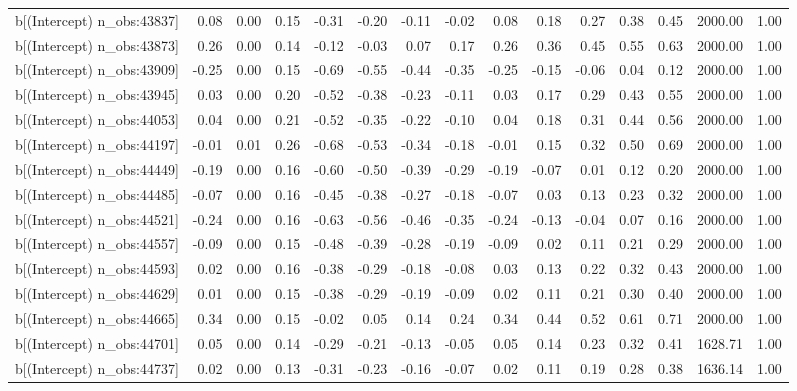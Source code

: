 \begin{table}[ht]
\begin{tabular}{rrrrrrrrrrrrrrr}
  b[(Intercept) n\_obs:43837] & 0.08 & 0.00 & 0.15 & -0.31 & -0.20 & -0.11 & -0.02 & 0.08 & 0.18 & 0.27 & 0.38 & 0.45 & 2000.00 & 1.00 \\ 
  b[(Intercept) n\_obs:43873] & 0.26 & 0.00 & 0.14 & -0.12 & -0.03 & 0.07 & 0.17 & 0.26 & 0.36 & 0.45 & 0.55 & 0.63 & 2000.00 & 1.00 \\ 
  b[(Intercept) n\_obs:43909] & -0.25 & 0.00 & 0.15 & -0.69 & -0.55 & -0.44 & -0.35 & -0.25 & -0.15 & -0.06 & 0.04 & 0.12 & 2000.00 & 1.00 \\ 
  b[(Intercept) n\_obs:43945] & 0.03 & 0.00 & 0.20 & -0.52 & -0.38 & -0.23 & -0.11 & 0.03 & 0.17 & 0.29 & 0.43 & 0.55 & 2000.00 & 1.00 \\ 
  b[(Intercept) n\_obs:44053] & 0.04 & 0.00 & 0.21 & -0.52 & -0.35 & -0.22 & -0.10 & 0.04 & 0.18 & 0.31 & 0.44 & 0.56 & 2000.00 & 1.00 \\ 
  b[(Intercept) n\_obs:44197] & -0.01 & 0.01 & 0.26 & -0.68 & -0.53 & -0.34 & -0.18 & -0.01 & 0.15 & 0.32 & 0.50 & 0.69 & 2000.00 & 1.00 \\ 
  b[(Intercept) n\_obs:44449] & -0.19 & 0.00 & 0.16 & -0.60 & -0.50 & -0.39 & -0.29 & -0.19 & -0.07 & 0.01 & 0.12 & 0.20 & 2000.00 & 1.00 \\ 
  b[(Intercept) n\_obs:44485] & -0.07 & 0.00 & 0.16 & -0.45 & -0.38 & -0.27 & -0.18 & -0.07 & 0.03 & 0.13 & 0.23 & 0.32 & 2000.00 & 1.00 \\ 
  b[(Intercept) n\_obs:44521] & -0.24 & 0.00 & 0.16 & -0.63 & -0.56 & -0.46 & -0.35 & -0.24 & -0.13 & -0.04 & 0.07 & 0.16 & 2000.00 & 1.00 \\ 
  b[(Intercept) n\_obs:44557] & -0.09 & 0.00 & 0.15 & -0.48 & -0.39 & -0.28 & -0.19 & -0.09 & 0.02 & 0.11 & 0.21 & 0.29 & 2000.00 & 1.00 \\ 
  b[(Intercept) n\_obs:44593] & 0.02 & 0.00 & 0.16 & -0.38 & -0.29 & -0.18 & -0.08 & 0.03 & 0.13 & 0.22 & 0.32 & 0.43 & 2000.00 & 1.00 \\ 
  b[(Intercept) n\_obs:44629] & 0.01 & 0.00 & 0.15 & -0.38 & -0.29 & -0.19 & -0.09 & 0.02 & 0.11 & 0.21 & 0.30 & 0.40 & 2000.00 & 1.00 \\ 
  b[(Intercept) n\_obs:44665] & 0.34 & 0.00 & 0.15 & -0.02 & 0.05 & 0.14 & 0.24 & 0.34 & 0.44 & 0.52 & 0.61 & 0.71 & 2000.00 & 1.00 \\ 
  b[(Intercept) n\_obs:44701] & 0.05 & 0.00 & 0.14 & -0.29 & -0.21 & -0.13 & -0.05 & 0.05 & 0.14 & 0.23 & 0.32 & 0.41 & 1628.71 & 1.00 \\ 
  b[(Intercept) n\_obs:44737] & 0.02 & 0.00 & 0.13 & -0.31 & -0.23 & -0.16 & -0.07 & 0.02 & 0.11 & 0.19 & 0.28 & 0.38 & 1636.14 & 1.00 \\ 

\end{tabular}
\end{table}

